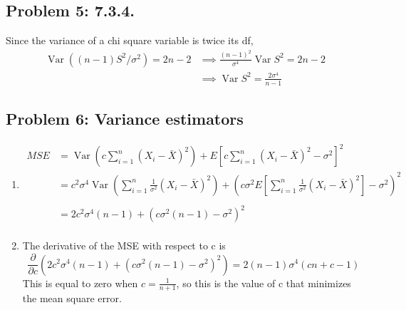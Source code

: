 \documentclass{article}
\newcommand{\var}{\operatorname{Var}}
\begin{document}
\subsection*{Problem 5: 7.3.4.}
Since the variance of a chi square variable is twice its df,
\begin{align*}
	\var((n-1)S^2/\sigma^2) = 2n-2
	&\implies \frac{(n-1)^2}{\sigma^4}\var{S^2} = 2n-2 \\
	&\implies \var{S^2} = \frac{2\sigma^4}{n-1}
\end{align*}
\newpage 

\subsection*{Problem 6: Variance estimators}
\begin{enumerate}
	\item \begin{align*}
		MSE &= \var(c\sum_{i=1}^n (X_i - \bar{X})^2) + E[c\sum_{i=1}^n (X_i - \bar{X})^2 - \sigma^2]^2 \\
		&= c^2\sigma^4\var(\sum_{i=1}^n \frac{1}{\sigma^2}(X_i - \bar{X})^2) +
			(c\sigma^2 E[\sum_{i=1}^n \frac{1}{\sigma^2}(X_i - \bar{X})^2] - \sigma^2)^2 \\\\
		&= 2c^2\sigma^4(n-1) + (c\sigma^2(n-1)-\sigma^2)^2 \\
	\end{align*}
	\item The derivative of the MSE with respect to c is 
	\[	
		\frac{\partial}{\partial c }(2c^2\sigma^4(n-1) + (c\sigma^2(n-1)-\sigma^2)^2)
		= 2(n-1)\sigma^4(cn+c-1)
	\]
	This is equal to zero when $c = \frac{1}{n+1}$, so this is the value of c 
	that minimizes the mean square error.
\end{enumerate}
\end{document}

